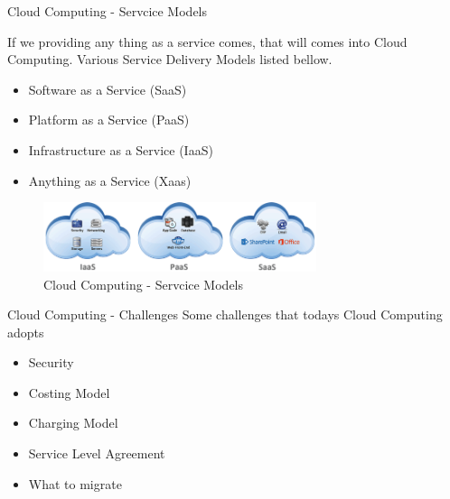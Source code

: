 \documentclass[xcolor=dvipsnames]{beamer}
\begin{document}
\begin{frame}{Cloud Computing - Servcice Models }

If we providing any thing as a service comes, that will comes into Cloud Computing. Various Service Delivery Models listed bellow.

\begin{itemize}
\item Software as a Service (SaaS) 
\item Platform as a Service (PaaS)
\item Infrastructure as a Service (IaaS)
\item Anything as a Service (Xaas)
\end{itemize}
\begin{figure}[H]
 \centering
 \includegraphics[width=8cm]{./service.png}
 \caption{Cloud Computing - Servcice Models \label{fig:Cloud Computing - Servcice Models} }
\end{figure}

\end{frame}

\begin{frame}{Cloud Computing - Challenges \cite{ref_1}}
Some challenges that todays Cloud Computing adopts

\begin{itemize}
\item Security
\item Costing Model
\item Charging Model
\item Service Level Agreement
\item What to migrate
\end{itemize}
\end{frame}
\end{document}
